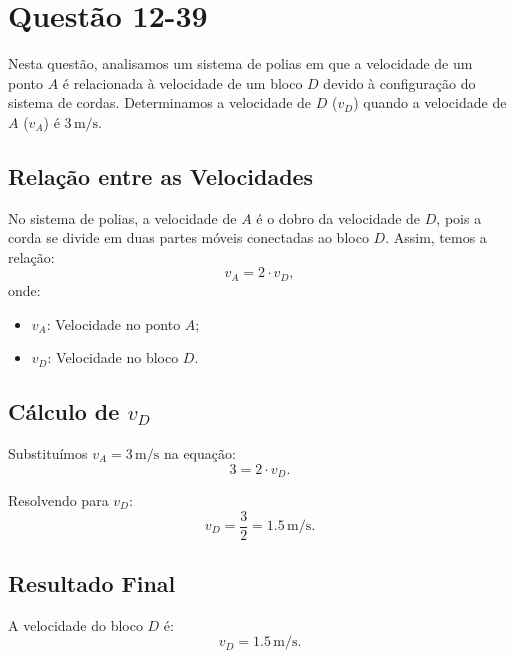 \section{Questão 12-39}

Nesta questão, analisamos um sistema de polias em que a velocidade de um ponto \(A\) é relacionada à velocidade de um bloco \(D\) devido à configuração do sistema de cordas. Determinamos a velocidade de \(D\) (\(v_D\)) quando a velocidade de \(A\) (\(v_A\)) é \(3 \, \text{m/s}\).

\subsection*{Relação entre as Velocidades}
No sistema de polias, a velocidade de \(A\) é o dobro da velocidade de \(D\), pois a corda se divide em duas partes móveis conectadas ao bloco \(D\). Assim, temos a relação:
\[
v_A = 2 \cdot v_D,
\]
onde:
\begin{itemize}
    \item \(v_A\): Velocidade no ponto \(A\);
    \item \(v_D\): Velocidade no bloco \(D\).
\end{itemize}

\subsection*{Cálculo de \(v_D\)}
Substituímos \(v_A = 3 \, \text{m/s}\) na equação:
\[
3 = 2 \cdot v_D.
\]

Resolvendo para \(v_D\):
\[
v_D = \frac{3}{2} = 1.5 \, \text{m/s}.
\]

\subsection*{Resultado Final}
A velocidade do bloco \(D\) é:
\[
v_D = 1.5 \, \text{m/s}.
\]
